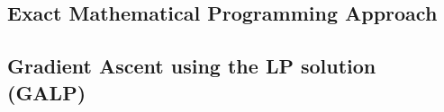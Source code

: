 
%
%
%

\subsection{Exact Mathematical Programming Approach}

\subsection{Gradient Ascent using the LP solution (GALP)}

